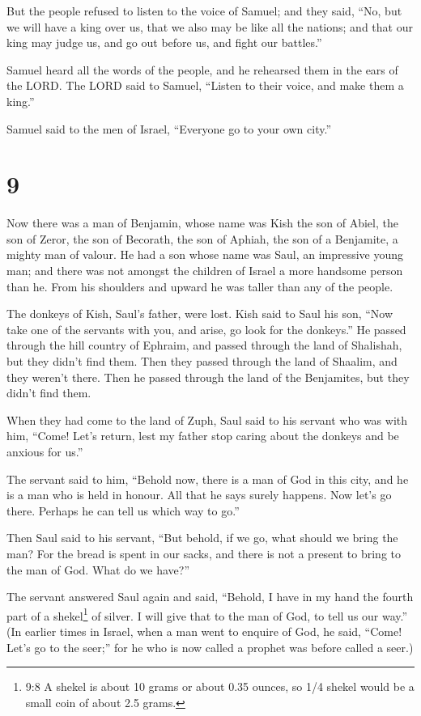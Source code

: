  But the people refused to listen to the voice of Samuel;
and they said, ``No, but we will have a king over us,  that
we also may be like all the nations; and that our king may judge us, and
go out before us, and fight our battles.''

 Samuel heard all the words of the people, and he rehearsed
them in the ears of the LORD.  The LORD said to Samuel,
``Listen to their voice, and make them a king.''

Samuel said to the men of Israel, ``Everyone go to your own city.''

\hypertarget{section-8}{%
\section{9}\label{section-8}}

 Now there was a man of Benjamin, whose name was Kish the
son of Abiel, the son of Zeror, the son of Becorath, the son of Aphiah,
the son of a Benjamite, a mighty man of valour.  He had a
son whose name was Saul, an impressive young man; and there was not
amongst the children of Israel a more handsome person than he. From his
shoulders and upward he was taller than any of the people.

 The donkeys of Kish, Saul's father, were lost. Kish said to
Saul his son, ``Now take one of the servants with you, and arise, go
look for the donkeys.''  He passed through the hill country
of Ephraim, and passed through the land of Shalishah, but they didn't
find them. Then they passed through the land of Shaalim, and they
weren't there. Then he passed through the land of the Benjamites, but
they didn't find them.

 When they had come to the land of Zuph, Saul said to his
servant who was with him, ``Come! Let's return, lest my father stop
caring about the donkeys and be anxious for us.''

 The servant said to him, ``Behold now, there is a man of
God in this city, and he is a man who is held in honour. All that he
says surely happens. Now let's go there. Perhaps he can tell us which
way to go.''

 Then Saul said to his servant, ``But behold, if we go, what
should we bring the man? For the bread is spent in our sacks, and there
is not a present to bring to the man of God. What do we have?''

 The servant answered Saul again and said, ``Behold, I have
in my hand the fourth part of a shekel\footnote{9:8 A shekel is about 10
  grams or about 0.35 ounces, so 1/4 shekel would be a small coin of
  about 2.5 grams.} of silver. I will give that to the man of God, to
tell us our way.''  (In earlier times in Israel, when a man
went to enquire of God, he said, ``Come! Let's go to the seer;'' for he
who is now called a prophet was before called a seer.)

